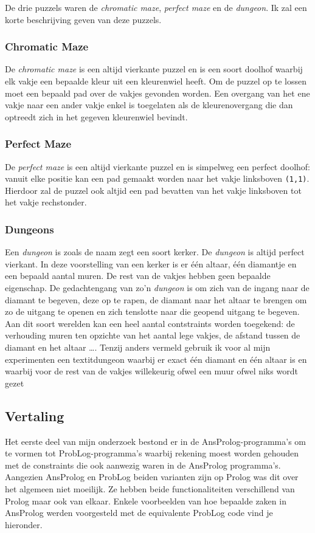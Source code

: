 \documentclass{article}
\begin{document}
	De drie puzzels waren de \textit{chromatic maze}, \textit{perfect maze} en de \textit{dungeon}. Ik zal een korte beschrijving geven van deze puzzels.
	\subsubsection*{Chromatic Maze}
	De \textit{chromatic maze} is een altijd vierkante puzzel en is een soort doolhof waarbij  elk vakje een bepaalde kleur uit een kleurenwiel heeft. Om de puzzel op te lossen moet een bepaald pad over de vakjes gevonden worden. Een overgang van het ene vakje naar een ander vakje enkel is toegelaten als de kleurenovergang die dan optreedt zich in het gegeven kleurenwiel bevindt.
	
	\subsubsection*{Perfect Maze}
	De \textit{perfect maze} is een altijd vierkante puzzel en is simpelweg een perfect doolhof: vanuit elke positie kan een pad gemaakt worden naar het vakje linksboven \texttt{(1,1)}. Hierdoor zal de puzzel ook altjid een pad bevatten van het vakje linksboven tot het vakje rechstonder.
	
		\subsubsection*{Dungeons}
	Een \textit{dungeon} is zoals de naam zegt een soort kerker. De \textit{dungeon} is altijd perfect vierkant. In deze voorstelling van een kerker is er \'e\'en altaar, \'e\'en diamantje en een bepaald aantal muren. De rest van de vakjes hebben geen bepaalde eigenschap. De gedachtengang van zo'n \textit{dungeon} is om zich van de ingang naar de diamant te begeven, deze op te rapen, de diamant naar het altaar te brengen om zo de uitgang te openen en zich tenslotte naar die geopend uitgang te begeven. Aan dit soort werelden kan een heel aantal contstraints worden toegekend: de verhouding muren ten opzichte van het aantal lege vakjes, de afstand tussen de diamant en het altaar \dots. Tenzij anders vermeld gebruik ik voor al mijn experimenten een textit{dungeon} waarbij er exact \'e\'en diamant en \'e\'en altaar is en waarbij voor de rest van de vakjes willekeurig ofwel een muur ofwel niks wordt gezet
	
	\subsection{Vertaling}
	Het eerste deel van mijn onderzoek bestond er in de AnsProlog-programma's om te vormen tot ProbLog-programma's waarbij rekening moest worden gehouden met de constraints die ook aanwezig waren in de AnsProlog programma's. Aangezien AnsProlog en ProbLog beiden varianten zijn op Prolog was dit over het algemeen niet moeilijk. Ze hebben beide functionaliteiten verschillend van Prolog maar ook van elkaar. Enkele voorbeelden van hoe bepaalde zaken in AnsProlog werden voorgesteld met de equivalente ProbLog code vind je hieronder. 
	
\end{document}
